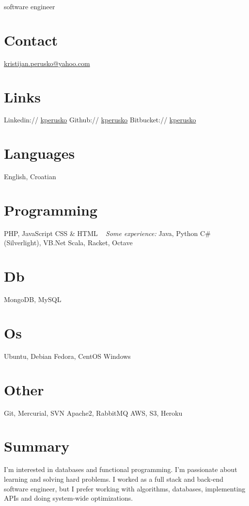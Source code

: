 \documentclass[]{cv}
\begin{document}
       {software engineer}


\begin{aside}
  \section{Contact}
    \href{mailto:kristijan.perusko@yahoo.com}{kristijan.perusko@yahoo.com}
  \section{Links}  
    Linkedin://  \href{https://www.linkedin.com/in/kperusko}{kperusko}
    Github:// \href{https://github.com/kperusko}{kperusko}
    Bitbucket:// \href{https://bitbucket.org/kperusko}{kperusko}
  \section{Languages}
    English, Croatian
  \section{Programming}
    PHP, JavaScript
    CSS \& HTML
~     
    \emph{Some experience:}
    Java, Python
    C\# (Silverlight), VB.Net
    Scala, Racket, Octave
  \section{Db}
    MongoDB, MySQL
  \section{Os}
    Ubuntu, Debian 
    Fedora, CentOS
    Windows
  \section{Other}
    Git, Mercurial, SVN
    Apache2, RabbitMQ
    AWS, S3, Heroku
\end{aside}

\section{Summary}

I’m interested in databases and functional programming. I'm passionate about learning and solving hard problems. I worked as a full stack and back-end software engineer, but I prefer working with algorithms, databases, implementing APIs and doing system-wide optimizations. 
\end{document}
